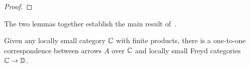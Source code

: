 \begin{proof}
\end{proof}
The two lemmas together establish the main result of~\cite{cat-semantics-arr}.
\begin{theorem}
    Given any locally small category $\mathbb{C}$ with finite products, there is a
    one-to-one correspondence between arrows $A$ over $\mathbb{C}$ and locally small
    Freyd categories $\mathbb{C} \to \mathbb{D}$.
\end{theorem}
